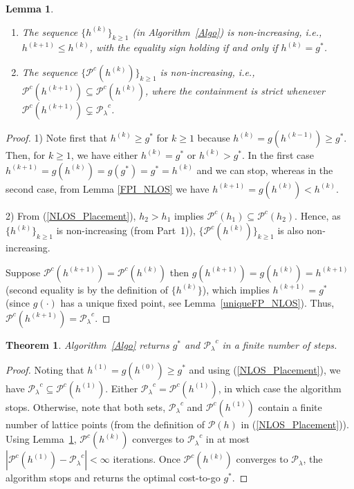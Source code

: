 \documentclass[conference]{IEEEtran}
\newtheorem{theorem}{Theorem}
\newtheorem{lemma}{Lemma}
\begin{document}
\begin{lemma}\label{hk_nonincreasing_NLOS}
\begin{enumerate}
\item The sequence $\{h^{(k)}\}_{k\geq 1}$ (in Algorithm~\ref{Algo}) is non-increasing,
i.e., $h^{(k+1)}\leq h^{(k)}$, with the equality sign holding if and only if $h^{(k)}=g^*$.
\item The sequence ${\{\mathcal{P}^c(h^{(k)})}\}_{k\geq 1}$ is non-increasing, i.e., $\mathcal{P}^c(h^{(k+1)})\subseteq \mathcal{P}^c(h^{(k)})$, where the containment is strict whenever $\mathcal{P}^c(h^{(k+1)})\varsubsetneq{\mathcal{P}_{\lambda}}^c$.
\end{enumerate}
\end{lemma}
\begin{proof}
1) Note first that $h^{(k)}\geq g^*$ for $k\geq 1$ because $h^{(k)}=g(h^{(k-1)})\geq g^*$. Then, for $k \geq 1$, we have either $h^{(k)} = g^*$ or  $h^{(k)} > g^*$. In the first case $h^{(k+1)} = g(h^{(k)})=g(g^*)=g^*=h^{(k)}$ and we can stop, whereas in the second case, from Lemma \ref{FPI_NLOS} we have  $h^{(k+1)} = g(h^{(k)}) < h^{(k)}$. 

2) From (\ref{NLOS_Placement}), $h_2>h_1$ implies $\mathcal{P}^c(h_1)\subseteq  \mathcal{P}^c(h_2)$. 
Hence, as $\{h^{(k)}\}_{k\geq 1}$ is non-increasing (from Part~1)), 
${\{\mathcal{P}^c(h^{(k)})}\}_{k\geq 1}$ is also non-increasing. 

Suppose $\mathcal{P}^c(h^{(k+1)})=\mathcal{P}^c(h^{(k)})$ then $g(h^{(k+1)})=g(h^{(k)})=h^{(k+1)}$
(second equality is by the definition of $\{h^{(k)}\}$), which implies $h^{(k+1)}=g^*$ (since $g(\cdot)$ has a unique fixed point, see Lemma~\ref{uniqueFP_NLOS}). Thus, $\mathcal{P}^c(h^{(k+1)})={\mathcal{P}_{\lambda}}^c$.
\end{proof}

\begin{theorem}
Algorithm~\ref{Algo} returns $g^*$ and ${\mathcal{P}_{\lambda}}^c$ in a finite number of steps. 
\end{theorem}
\begin{proof}
Noting that $h^{(1)}=g(h^{(0)})\geq g^*$ and using (\ref{NLOS_Placement}), we have 
${\mathcal{P}_{\lambda}}^c \subseteq \mathcal{P}^c(h^{(1)})$. Either ${\mathcal{P}_{\lambda}}^c = \mathcal{P}^c(h^{(1)})$, in which case the algorithm stops. Otherwise, note that both sets, ${\mathcal{P}_{\lambda}}^c$ and $\mathcal{P}^c(h^{(1)})$ contain a finite number of lattice points (from the definition of $\mathcal{P}(h)$ in (\ref{NLOS_Placement})). Using Lemma~\ref{hk_nonincreasing_NLOS}, $\mathcal{P}^c(h^{(k)})$ converges to ${\mathcal{P}_{\lambda}}^c$ in at most $|\mathcal{P}^c(h^{(1)})-{\mathcal{P}_{\lambda}}^c|<\infty$ iterations. Once $\mathcal{P}^c(h^{(k)})$ converges to ${\mathcal{P}_{\lambda}}$, the algorithm stops and returns the optimal cost-to-go $g^*$.
\end{proof}
\end{document}
